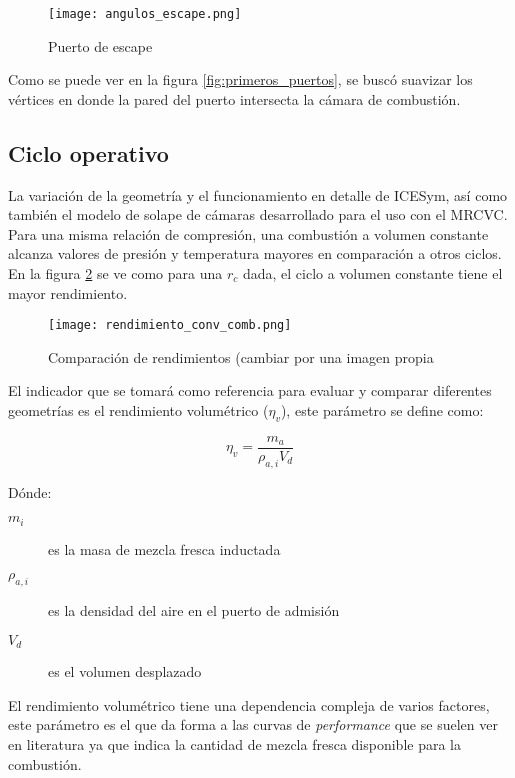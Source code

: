 \begin{figure}
    \centering
    \texttt{[image: angulos\_escape.png]}
    \caption{Puerto de escape}
    \label{fig:angulos_escape}
\end{figure}

Como se puede ver en la figura \ref{fig:primeros_puertos}, se buscó suavizar los
vértices en donde la pared del puerto intersecta la cámara de combustión.

\subsection{Ciclo operativo}
%
La variación de la geometría y el funcionamiento en detalle de ICESym, así como
también el modelo de solape de cámaras desarrollado para el uso con el MRCVC.
%
Para una misma relación de compresión, una combustión a volumen constante
alcanza valores de presión y temperatura mayores en comparación a otros ciclos.
%
En la figura \ref{fig:comparacion_rendimientos} se ve como para una $r_c$ dada,
el ciclo a volumen constante tiene el mayor rendimiento.

\begin{figure}
    \centering
    \texttt{[image: rendimiento\_conv\_comb.png]}
    \caption{Comparación de rendimientos (cambiar por una imagen propia}
    \label{fig:comparacion_rendimientos}
\end{figure}

El indicador que se tomará como referencia para evaluar y comparar diferentes
geometrías es el rendimiento volumétrico ($\eta_v$), este parámetro se define
como:

\begin{equation}
    \eta_v = \frac{m_a}{\rho_{a,i}V_d}
\end{equation}

Dónde:
%
\begin{description}
    \item[$m_i$] es la masa de mezcla fresca inductada
    \item[$\rho_{a,i}$] es la densidad del aire en el puerto de admisión
    \item[$V_d$] es el volumen desplazado
\end{description}

El rendimiento volumétrico tiene una dependencia compleja de varios factores,
este parámetro es el que da forma a las curvas de \emph{performance} que se
suelen ver en literatura ya que indica la cantidad de mezcla fresca disponible
para la combustión. 
%

